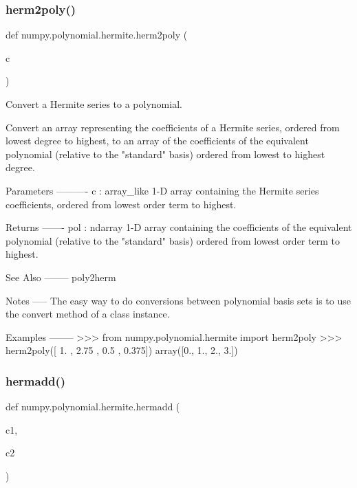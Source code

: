 \subsubsection{\texorpdfstring{herm2poly()}{herm2poly()}}
{\footnotesize\ttfamily def numpy.\+polynomial.\+hermite.\+herm2poly (\begin{DoxyParamCaption}\item[{}]{c }\end{DoxyParamCaption})}

\begin{DoxyVerb}Convert a Hermite series to a polynomial.

Convert an array representing the coefficients of a Hermite series,
ordered from lowest degree to highest, to an array of the coefficients
of the equivalent polynomial (relative to the "standard" basis) ordered
from lowest to highest degree.

Parameters
----------
c : array_like
    1-D array containing the Hermite series coefficients, ordered
    from lowest order term to highest.

Returns
-------
pol : ndarray
    1-D array containing the coefficients of the equivalent polynomial
    (relative to the "standard" basis) ordered from lowest order term
    to highest.

See Also
--------
poly2herm

Notes
-----
The easy way to do conversions between polynomial basis sets
is to use the convert method of a class instance.

Examples
--------
>>> from numpy.polynomial.hermite import herm2poly
>>> herm2poly([ 1.   ,  2.75 ,  0.5  ,  0.375])
array([0., 1., 2., 3.])\end{DoxyVerb}
 \mbox{\label{namespacenumpy_1_1polynomial_1_1hermite_ac11d10b479c34307cc42be929488322c}} 
\subsubsection{\texorpdfstring{hermadd()}{hermadd()}}
{\footnotesize\ttfamily def numpy.\+polynomial.\+hermite.\+hermadd (\begin{DoxyParamCaption}\item[{}]{c1,  }\item[{}]{c2 }\end{DoxyParamCaption})}

